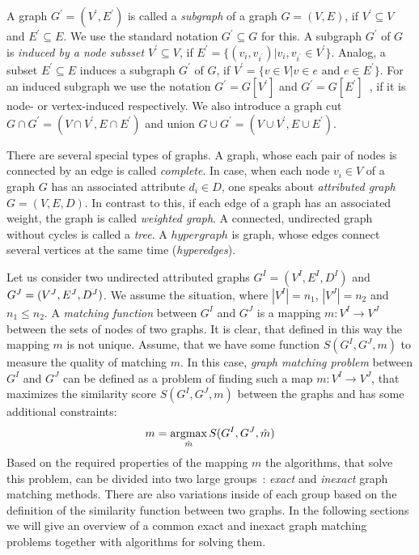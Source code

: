 A graph $G^\prime=(V^\prime,E^\prime)$ is called a \emph{subgraph} of a graph $G=(V,E)$, if $V^\prime\subseteq V$ and $E^\prime\subseteq E$. We use the standard notation $G^\prime\subseteq G$ for this. A subgraph $G^\prime$ of $G$ is \emph{induced by a node subsset $V^\prime\subseteq V$}, if $E^\prime=\{(v_i, v_{i^\prime})|v_i,v_{i^\prime}\in V^\prime\}$. Analog, a subset $E^\prime\subseteq E$ induces a subgraph $G^\prime$ of $G$, if $V^\prime=\{v\in V|v\in e\text{ and }e\in E^\prime\}$. For an induced subgraph we use the notation $G^\prime=G[V^\prime]$ and $G^\prime=G[E^\prime]$~\cite{Diestel2000}, if it is node- or vertex-induced respectively. We also introduce a graph cut $G\cap G^\prime=(V\cap V^\prime, E\cap E^\prime)$ and union $G\cup G^\prime=(V\cup V^\prime, E\cup E^\prime)$.

There are several special types of graphs. A graph, whose each pair of nodes is connected by an edge is called \emph{complete}. In case, when each node $v_i\in V$ of a graph $G$ has an associated attribute $d_i\in D$, one speaks about \emph{attributed graph} $G=(V,E,D)$. In contrast to this, if each edge of a graph has an associated weight, the graph is called \emph{weighted graph}. A connected, undirected graph without cycles is called a \emph{tree}. A $hypergraph$ is graph, whose edges connect several vertices at the same time (\emph{hyperedges}).

Let us consider two undirected attributed graphs $G^I = (V^I, E^I, D^I)$ and $G^J = (V^J, E^J,\newline D^J)$. We assume the situation, where $|V^I|=n_1$, $|V^J|=n_2$ and $n_1\le n_2$. A \emph{matching function} between $G^I$ and $G^J$ is a mapping $m:V^I\rightarrow V^J$ between the sets of nodes of two graphs.
It is clear, that defined in this way the mapping $m$ is not unique. Assume, that we have some function $S(G^I, G^J, m)$ to measure the quality of matching $m$. In this case, \emph{graph matching problem} between $G^I$ and $G^J$ can be defined as a problem of finding such a map $m:V^I\rightarrow V^J$, that maximizes the similarity score $S(G^I, G^J, m)$ between the graphs and has some additional constraints:
\begin{equation} \label{gGMP}
m = \mathop{\rm argmax}_{\hat{m}}S(G^I, G^J, \hat{m})
\end{equation}
Based on the required properties of the mapping $m$ the algorithms, that solve this problem, can be divided into two large groups~\cite{Conte2004}: \emph{exact} and \emph{inexact} graph matching methods. There are also variations inside of each group based on the definition of the similarity function between two graphs. In the following sections we will give an overview of a common exact and inexact graph matching problems together with algorithms for solving them.

